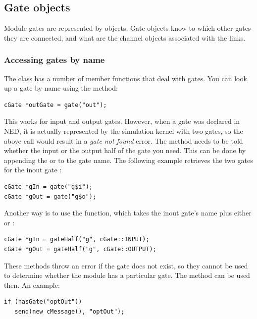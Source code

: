\subsection{Gate objects}

Module gates are represented by  objects.
Gate objects know to which other gates they are connected, and
what are the channel objects associated with the links.

\subsubsection{Accessing gates by name}

The  class has a number of member functions that
deal with gates. You can look up a gate by name using the 
method:

\begin{verbatim}
cGate *outGate = gate("out");
\end{verbatim}

This works for input and output gates. However, when a gate was declared
 in NED, it is actually represented by the simulation kernel
with two gates, so the above call would result in a \textit{gate not found}
error. The  method needs to be told whether the input or
the output half of the gate you need. This can be done by appending
the  or  to the gate name. The following example
retrieves the two gates for the inout gate :

\begin{verbatim}
cGate *gIn = gate("g$i");
cGate *gOut = gate("g$o");
\end{verbatim}

Another way is to use the  function, which takes
the inout gate's name plus either  or :

\begin{verbatim}
cGate *gIn = gateHalf("g", cGate::INPUT);
cGate *gOut = gateHalf("g", cGate::OUTPUT);
\end{verbatim}

These methods throw an error if the gate does not exist, so they cannot
be used to determine whether the module has a particular gate.
The  method can be used then. An example:

\begin{verbatim}
if (hasGate("optOut"))
   send(new cMessage(), "optOut");
\end{verbatim}


